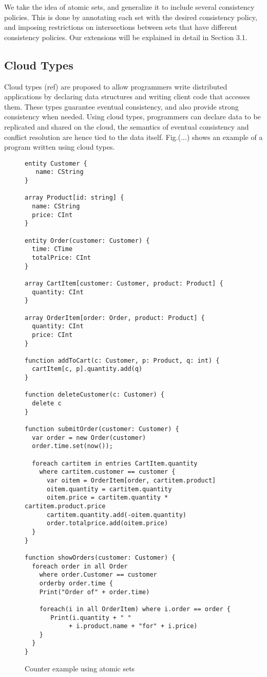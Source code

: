 We take the idea of atomic sets, and generalize it to include several
consistency policies. This is done by annotating each set with the desired
consistency policy, and imposing restrictions on intersections between sets that
have different consistency policies. Our extensions will be explained in detail in Section 3.1.

\subsection{Cloud Types}
Cloud types (ref) are proposed to allow programmers write distributed applications by
declaring data structures and writing client code that accesses them.
These types guarantee eventual consistency, and also provide strong consistency
when needed. Using cloud types, programmers can declare data to be replicated
and shared on the cloud, the semantics of eventual consistency and conflict
resolution are hence tied to the data itself. Fig.(...) shows an example of a
program written using cloud types. 


\begin{figure}[tp]
\begin{lstlisting}
entity Customer {
   name: CString
}

array Product[id: string] {
  name: CString
  price: CInt
}

entity Order(customer: Customer) {
  time: CTime
  totalPrice: CInt
}

array CartItem[customer: Customer, product: Product] {
  quantity: CInt
}

array OrderItem[order: Order, product: Product] {
  quantity: CInt
  price: CInt
}

function addToCart(c: Customer, p: Product, q: int) {
  cartItem[c, p].quantity.add(q)
}

function deleteCustomer(c: Customer) {
  delete c
}

function submitOrder(customer: Customer) {
  var order = new Order(customer)
  order.time.set(now());

  foreach cartitem in entries CartItem.quantity 
    where cartitem.customer == customer {
      var oitem = OrderItem[order, cartitem.product]
      oitem.quantity = cartitem.quantity
      oitem.price = cartitem.quantity * cartitem.product.price
      cartitem.quantity.add(-oitem.quantity)
      order.totalprice.add(oitem.price)
  }
}

function showOrders(customer: Customer) {
  foreach order in all Order
    where order.Customer == customer
    orderby order.time {    
    Print("Order of" + order.time)
    
    foreach(i in all OrderItem) where i.order == order {
       Print(i.quantity + " " 
            + i.product.name + "for" + i.price)
    }
  }
}
\end{lstlisting}
\caption{Counter example using atomic sets}
\label{lst:ctStore}
\end{figure}


